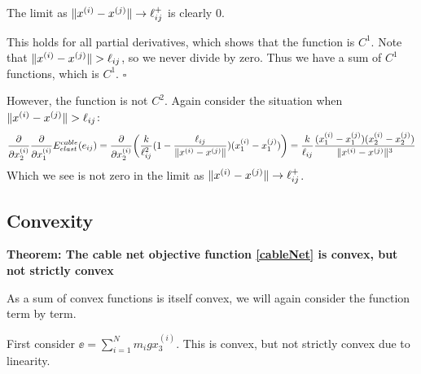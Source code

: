 
The limit as $\lVert x^{(i)} - x^{(j)}\rVert \to \ell_{ij}^{+}$ is clearly $0$.

This holds for all partial derivatives, which shows that the function is $C^1$. Note that $\lVert x^{(i)} - x^{(j)}\rVert>\ell_{ij}$, so we never divide by zero. Thus we have a sum of $C^1$ functions, which is $C^1$. \hfill $\square$ 

However, the function is not $C^2$. Again consider the situation when $\lVert x^{(i)} - x^{(j)}\rVert > \ell_{ij}$:
\begin{equation*}
    \frac{\partial}{\partial x_2^{(i)}} \frac{\partial}{\partial x_1^{(i)}} E^{cable}_{elast}(e_{ij}) = \frac{\partial}{\partial x_2^{(i)}}  \bigg (\frac{k}{\ell_{ij}^2} (1- \frac{\ell_{ij}}{\lVert x^{(i)} - x^{(j)}\rVert}) (x_1^{(i)} - x_1^{(j)}) \bigg) = \frac{k}{\ell_{ij}} \frac{(x_1^{(i)} - x_1^{(j)}) (x_2^{(i)}-x_2^{(j)})}{\lVert x^{(i)} - x^{(j)}\rVert^3} 
\end{equation*}
Which we see is not zero in the limit as $\lVert x^{(i)} - x^{(j)}\rVert \to \ell_{ij}^{+}$.  

\subsection{Convexity}

\textbf{Theorem: The cable net objective function \eqref{cableNet} is convex, but not strictly convex}

As a sum of convex functions is itself convex, we will again consider the function term by term.

First consider $\ee =\sum_{i=1}^N m_i g x_3^{(i)}$. This is convex, but not strictly convex due to linearity.

